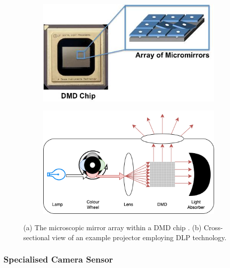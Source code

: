 \begin{figure}[H]
    \centering
    \begin{subfigure}{.4\textwidth}
        \centering
        \includegraphics[width=1\linewidth]{assets/dmd-chip.jpg}
        \caption{}
    \end{subfigure}
    \hfill
    \begin{subfigure}{.49\textwidth}
        \centering
        \includegraphics[width=1\linewidth]{assets/dlp-projector.png}
        \caption{}
    \end{subfigure}
    \caption{(a) The microscopic mirror array within a DMD chip \cite{HowDoesDLP}. (b) Cross-sectional view of an example projector employing DLP technology.}
    \label{fig:dmd_dlp}
\end{figure}

\subsubsection{Specialised Camera Sensor}

